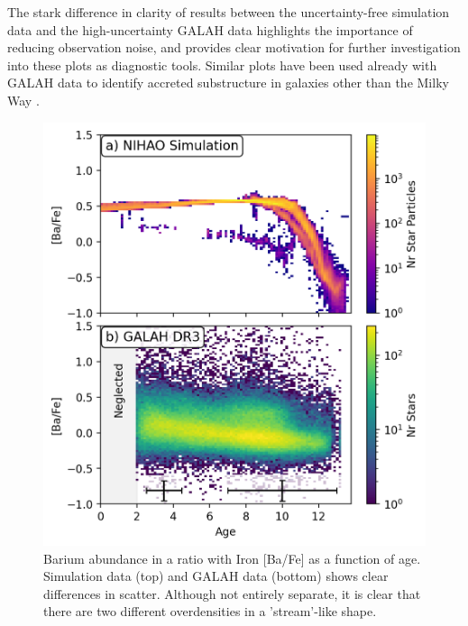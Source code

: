 \documentclass[fleqn,usenatbib]{mnras}
\begin{document}
The stark difference in clarity of results between the uncertainty-free simulation data and the high-uncertainty GALAH data highlights the importance of reducing observation noise, and provides clear motivation for further investigation into these plots as diagnostic tools. Similar plots have been used already with GALAH data to identify accreted substructure in galaxies other than the Milky Way \citep{Martig2021}. 
\begin{figure}
	\includegraphics[width=\columnwidth]{figures/Ba_Fe_time.png}
    \caption{Barium abundance in a ratio with Iron [Ba/Fe] as a function of age. Simulation data (top) and GALAH data (bottom) shows clear differences in scatter. Although not entirely separate, it is clear that there are two different overdensities in a 'stream'-like shape.}
    \label{fig:BaFetime}
\end{figure}
\end{document}

